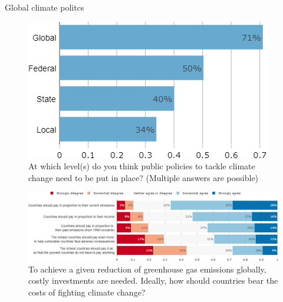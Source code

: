 \documentclass[aspectratio=169,9pt,dvipsnames]{beamer}
\begin{document}
\begin{frame}{Global climate politcs}%
\vspace{-0.2cm}
\begin{figure}
  \begin{minipage}[c]{0.3\textwidth}
		\caption{\small{At which level(s) do you think public policies to tackle climate change need to be put in place? (Multiple answers are possible)}}
  \end{minipage}\hfill
  \begin{minipage}[c]{0.67\textwidth}
    \includegraphics[width=.5\textwidth]{../figures/US/scale_US.png}
  \end{minipage}
\end{figure}


\begin{figure}[h!]
\centering
\caption{To achieve a given reduction of greenhouse gas emissions globally, costly investments are needed.
Ideally, how should countries bear the costs of fighting climate change?}
\vspace{2mm}
\includegraphics[width=.92\textwidth]{../figures/US/burden_sharing_US.png}
\end{figure}
\end{frame}
\end{document}
